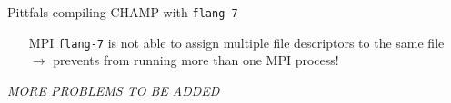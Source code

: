 \documentclass[aspectratio=169]{beamer}
\begin{document}
    \begin{frame}{Pittfals compiling CHAMP with \texttt{flang-7}}
      \begin{itemize}
        \item[MPI] \texttt{flang-7} is not able to assign multiple file descriptors to the same file $\longrightarrow$ prevents from running more than one MPI process! 
      \end{itemize}
\textit{      MORE PROBLEMS TO BE ADDED}
    \end{frame}
  
\end{document}
